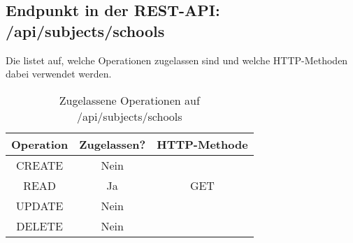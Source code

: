 \subsection{Endpunkt in der REST-API: /api/subjects/schools}
Die  listet auf, welche Operationen zugelassen sind und welche HTTP-Methoden dabei verwendet werden. 

\begin{table}[!htbp]
	\begin{tabular}{|c|c|c|}
		\hline
			\textbf{Operation} & \textbf{Zugelassen?} & \textbf{HTTP-Methode} \\ \hline
			CREATE & Nein & \\ \hline 
			READ & Ja & GET \\ \hline
			UPDATE & Nein & \\ \hline 
			DELETE & Nein & \\ \hline
	\end{tabular}

		\caption{Zugelassene Operationen auf /api/subjects/schools}
		\label{tab:end:rest:api:subjects:schools:meth}
\end{table}

%